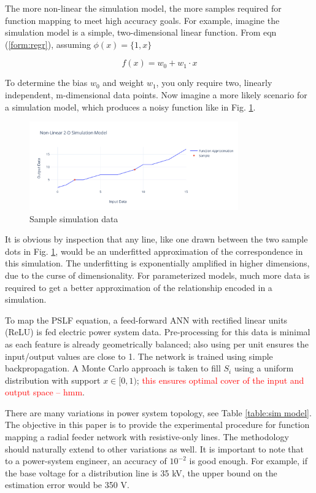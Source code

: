\documentclass[conference]{IEEEtran}
\begin{document}
The more non-linear the simulation model, the more samples required for function mapping to meet high accuracy goals. For example, imagine the simulation model is a simple, two-dimensional linear function. From eqn (\ref{form:regr}), assuming $\phi(x) = \{1, x\}$

\begin{equation} f(x) = w_{0} + w_{1} \cdot x \label{form: line} \end{equation}

To determine the bias $w_{0}$ and weight $w_{1}$, you only require two, linearly independent, m-dimensional data points. Now imagine a more likely scenario for a simulation model, which produces a noisy function like in Fig. \ref{fig:simdata}.

\begin{figure}[H]
	\centering
	\includegraphics[width=9cm]{simdata.pdf}
	\caption{Sample simulation data}
	\label{fig:simdata}
\end{figure}

It is obvious by inspection that any line, like one drawn between the two sample dots in Fig. \ref{fig:simdata}, would be an underfitted approximation of the correspondence in this simulation. The underfitting is exponentially amplified in higher dimensions, due to the curse of dimensionality. For parameterized models, much more data is required to get a better approximation of the relationship encoded in a simulation.

To map the PSLF equation, a feed-forward ANN with rectified linear units (ReLU) is fed electric power system data. Pre-processing for this data is minimal as each feature is already geometrically balanced; also using per unit ensures the input/output values are close to 1. The network is trained using simple backpropagation. A Monte Carlo approach is taken to fill $S_{i}$ using a uniform distribution with support $x \in [0, 1)$; \textcolor{red}{this ensures optimal cover of the input and output space -- hmm}.

There are many variations in power system topology, see Table \ref{table:sim model}. The objective in this paper is to provide the experimental procedure for function mapping a radial feeder network with resistive-only lines. The methodology should naturally extend to other variations as well. It is important to note that to a power-system engineer, an accuracy of $10^{-2}$ is good enough. For example, if the base voltage for a distribution line is 35 kV, the upper bound on the estimation error would be 350 V.
\end{document}
